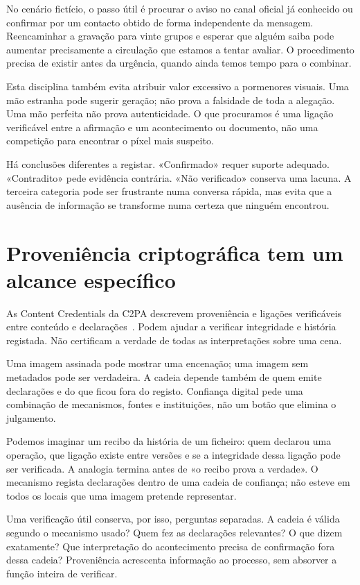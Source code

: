 No cenário fictício, o passo útil é procurar o aviso no canal oficial já conhecido ou confirmar por um contacto obtido de forma independente da mensagem. Reencaminhar a gravação para vinte grupos e esperar que alguém saiba pode aumentar precisamente a circulação que estamos a tentar avaliar. O procedimento precisa de existir antes da urgência, quando ainda temos tempo para o combinar.

Esta disciplina também evita atribuir valor excessivo a pormenores visuais. Uma mão estranha pode sugerir geração; não prova a falsidade de toda a alegação. Uma mão perfeita não prova autenticidade. O que procuramos é uma ligação verificável entre a afirmação e um acontecimento ou documento, não uma competição para encontrar o píxel mais suspeito.

Há conclusões diferentes a registar. «Confirmado» requer suporte adequado. «Contradito» pede evidência contrária. «Não verificado» conserva uma lacuna. A terceira categoria pode ser frustrante numa conversa rápida, mas evita que a ausência de informação se transforme numa certeza que ninguém encontrou.

\section{Proveniência criptográfica tem um alcance específico}
As Content Credentials da C2PA descrevem proveniência e ligações verificáveis entre conteúdo e declarações~\citep{c2pa22}. Podem ajudar a verificar integridade e história registada. Não certificam a verdade de todas as interpretações sobre uma cena.

Uma imagem assinada pode mostrar uma encenação; uma imagem sem metadados pode ser verdadeira. A cadeia depende também de quem emite declarações e do que ficou fora do registo. Confiança digital pede uma combinação de mecanismos, fontes e instituições, não um botão que elimina o julgamento.

Podemos imaginar um recibo da história de um ficheiro: quem declarou uma operação, que ligação existe entre versões e se a integridade dessa ligação pode ser verificada. A analogia termina antes de «o recibo prova a verdade». O mecanismo regista declarações dentro de uma cadeia de confiança; não esteve em todos os locais que uma imagem pretende representar.

Uma verificação útil conserva, por isso, perguntas separadas. A cadeia é válida segundo o mecanismo usado? Quem fez as declarações relevantes? O que dizem exatamente? Que interpretação do acontecimento precisa de confirmação fora dessa cadeia? Proveniência acrescenta informação ao processo, sem absorver a função inteira de verificar.

